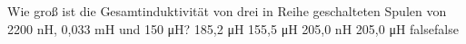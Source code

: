     {Wie groß ist die Gesamtinduktivität von drei in Reihe geschalteten Spulen von 2200 nH, 0,033 mH und 150 μH?}
    {185,2 μH}
    {155,5 μH}
    {205,0 nH}
    {205,0 μH}
    {false}{false}